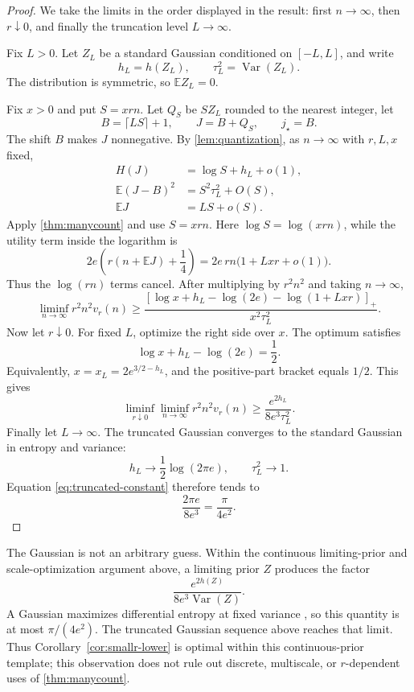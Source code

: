 \documentclass[11pt]{article}
\newcommand{\E}{\mathbb{E}}
\newcommand{\Var}{\operatorname{Var}}
\newcommand{\pos}[1]{\left[#1\right]_{+}}
\theoremstyle{definition}
\begin{document}
\begin{proof}
We take the limits in the order displayed in the result: first $n\to\infty$, then $r\downarrow0$, and finally the truncation level $L\to\infty$.

Fix $L>0$. Let $Z_L$ be a standard Gaussian conditioned on $[-L,L]$, and write
\[
  h_L=h(Z_L),
  \qquad
  \tau_L^2=\Var(Z_L).
\]
The distribution is symmetric, so $\E Z_L=0$.

Fix $x>0$ and put $S=xrn$. Let $Q_S$ be $SZ_L$ rounded to the nearest integer, let
\[
  B=\lceil LS\rceil+1,
  \qquad
  J=B+Q_S,
  \qquad
  j_\star=B.
\]
The shift $B$ makes $J$ nonnegative. By \cref{lem:quantization}, as $n\to\infty$ with $r,L,x$ fixed,
\begin{align*}
  H(J)&=\log S+h_L+o(1),\\
  \E(J-B)^2&=S^2\tau_L^2+O(S),\\
  \E J&=LS+o(S).
\end{align*}
Apply \cref{thm:manycount} and use $S=xrn$. Here $\log S=\log(xrn)$, while the utility term inside the logarithm is
\[
  2e\left(r(n+\E J)+\frac14\right)
  =2e\,rn\bigl(1+Lxr+o(1)\bigr).
\]
Thus the $\log(rn)$ terms cancel. After multiplying by $r^2n^2$ and taking $n\to\infty$,
\begin{equation}
  \liminf_{n\to\infty}r^2n^2v_r(n)
  \ge
  \frac{
    \pos{
      \log x+h_L-\log(2e)-\log(1+Lxr)
    }
  }{
    x^2\tau_L^2
  }.
  \label{eq:truncated-lower}
\end{equation}
Now let $r\downarrow0$. For fixed $L$, optimize the right side over $x$. The optimum satisfies
\[
  \log x+h_L-\log(2e)=\frac12.
\]
Equivalently, $x=x_L=2e^{3/2-h_L}$, and the positive-part bracket equals $1/2$. This gives
\begin{equation}
  \liminf_{r\downarrow0}
  \liminf_{n\to\infty}r^2n^2v_r(n)
  \ge
  \frac{e^{2h_L}}{8e^3\tau_L^2}.
  \label{eq:truncated-constant}
\end{equation}
Finally let $L\to\infty$. The truncated Gaussian converges to the standard Gaussian in entropy and variance:
\[
  h_L\to\frac12\log(2\pi e),
  \qquad
  \tau_L^2\to1.
\]
Equation \eqref{eq:truncated-constant} therefore tends to
\[
  \frac{2\pi e}{8e^3}
  =\frac{\pi}{4e^2}.
\]
\end{proof}

The Gaussian is not an arbitrary guess. Within the continuous limiting-prior and scale-optimization argument above, a limiting prior $Z$ produces the factor
\[
  \frac{e^{2h(Z)}}{8e^3\Var(Z)}.
\]
A Gaussian maximizes differential entropy at fixed variance \citep{CoverThomas2006}, so this quantity is at most $\pi/(4e^2)$. The truncated Gaussian sequence above reaches that limit. Thus Corollary~\ref{cor:smallr-lower} is optimal within this continuous-prior template; this observation does not rule out discrete, multiscale, or $r$-dependent uses of \cref{thm:manycount}.
\end{document}
